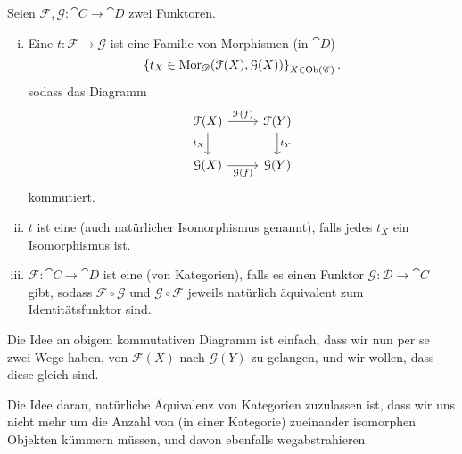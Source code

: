 \begin{definition}\label{def:natürliche-transformation-und-äquivalenz}
    Seien $\mathcal{F},\mathcal{G}\colon  \cat{C} \to  \cat{D}$ zwei Funktoren. 
    \begin{enumerate}[i)]
        \item 
    Eine  $t\colon  \mathcal{F} \to  \mathcal{G}$ ist eine Familie von Morphismen (in $\cat{D}$)
    \[
        \left \{t_X \in  \operatorname{Mor}_{\mathscr{D}}(\mathcal{F}(X),\mathcal{G}(X))\right\} _{X\in \operatorname{Ob}(\mathscr{C})}
    .\] 
    sodass das Diagramm
    \begin{equation*}
        \begin{tikzcd}
            \mathcal{F}(X) \ar{r}{\mathcal{F}(f)} \ar[swap]{d}{t_X} & \mathcal{F}(Y) \ar{d}{t_{Y}} \\
            \mathcal{G}(X) \ar[swap]{r}{\mathcal{G}(f)} & \mathcal{G}(Y)
        \end{tikzcd}
    \end{equation*}
    kommutiert.
\item $t$ ist eine   (auch natürlicher Isomorphismus genannt), falls jedes $t_X$ ein Isomorphismus ist. 
\item $\mathcal{F}\colon  \cat{C} \to  \cat{D}$ ist eine  (von Kategorien), falls es einen Funktor $\mathcal{G} \colon  \mathcal{D} \to  \cat{C}$ gibt, sodass $\mathcal{F} \circ  \mathcal{G}$ und $\mathcal{G} \circ  \mathcal{F}$ jeweils natürlich äquivalent zum Identitätsfunktor sind.
    \end{enumerate}
\end{definition}

\begin{remark*}
    Die Idee an obigem kommutativen Diagramm ist einfach, dass wir nun per se zwei Wege haben, von $\mathcal{F}(X)$ nach $\mathcal{G}(Y)$ zu gelangen, und wir wollen, dass diese gleich sind.
\end{remark*}

\begin{oral}
    Die Idee daran, natürliche Äquivalenz von Kategorien zuzulassen ist, dass wir uns nicht mehr um die Anzahl von (in einer Kategorie) zueinander isomorphen Objekten kümmern müssen, und davon ebenfalls wegabstrahieren.
\end{oral}


